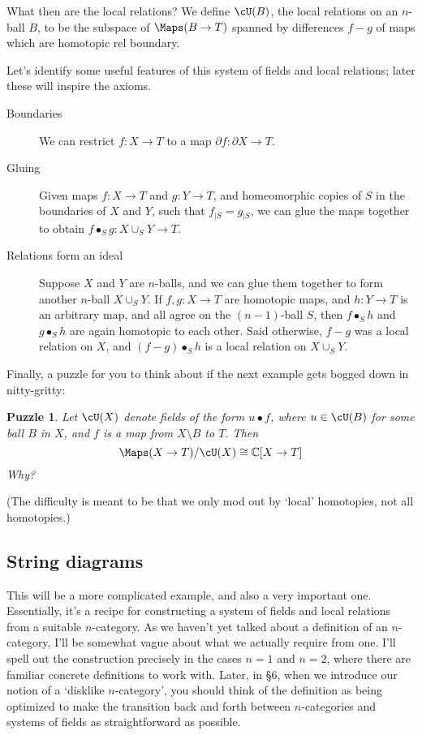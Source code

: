 \documentclass[11pt]{amsart}
\theoremstyle{plain}
\newtheorem{puzzle}[prop]{Puzzle}
\newcommand{\bdy}{\partial}
\newcommand{\iso}{\cong}
\newcommand{\restrict}[2]{#1{}_{\mid #2}{}}
\begin{document}
What then are the local relations? We define $\cU(B)$, the local relations on an $n$-ball $B$, to be the subspace of $\Maps(B \to T)$ spanned by differences $f-g$ of maps which are homotopic rel boundary.

Let's identify some useful features of this system of fields and local relations; later these will inspire the axioms.

\begin{description}
\item[Boundaries] We can restrict $f: X \to T$ to a map $\bdy f: \bdy X \to T$.
\item[Gluing] Given maps $f: X \to T$ and $g: Y \to T$, and homeomorphic copies of $S$ in the boundaries of $X$ and $Y$, such that $\restrict{f}{S} = \restrict{g}{S}$, we can glue the maps together to obtain $f \bullet_S g : X \cup_S Y \to T$.
\item[Relations form an ideal]
Suppose $X$ and $Y$ are $n$-balls, and we can glue them together to form another $n$-ball $X \cup_S Y$.
If $f, g: X \to T$ are homotopic maps, and $h: Y \to T$ is an arbitrary map, and all agree on the $(n-1)$-ball $S$, then $f \bullet_S h$ and $g \bullet_S h$ are again homotopic to each other. Said otherwise, $f-g$ was a local relation on $X$, and $(f-g) \bullet_S h$ is a local relation on $X \cup_S Y$.
\end{description}

Finally, a puzzle for you to think about if the next example gets bogged down in nitty-gritty:
\begin{puzzle}
Let $\cU(X)$ denote fields of the form $u \bullet f$, where $u \in \cU(B)$ for some ball $B$ in $X$, and $f$ is a map from $X \setminus B$ to $T$. Then $$\Maps(X \to T) / \cU(X) \iso \mathbb{C}[X \to T]$$ Why?
\end{puzzle}
(The difficulty is meant to be that we only mod out by `local' homotopies, not all homotopies.)


\subsection{String diagrams}
This will be a more complicated example, and also a very important one. Essentially, it's a recipe for constructing a system of fields and local relations from a suitable $n$-category. As we haven't yet talked about a definition of an $n$-category, I'll be somewhat vague about what we actually require from one. I'll spell out the construction precisely in the cases $n=1$ and $n=2$, where there are familiar concrete definitions to work with. Later, in \S 6, when we introduce our notion of a `disklike $n$-category', you should think of the definition as being optimized to make the transition back and forth between $n$-categories and systems of fields as straightforward as possible.
\end{document}
